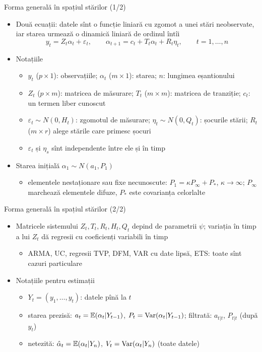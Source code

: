 \begin{frame}{Forma generală în spațiul stărilor (1/2)}
\itemsize{\small}
\begin{itemize}
    \item Două ecuații: datele sînt o funcție liniară cu zgomot a unei stări neobservate, iar starea urmează o dinamică liniară de ordinul întîi \[ y_t = Z_t\alpha_t + \varepsilon_t, \qquad \alpha_{t+1} = c_t + T_t\alpha_t + R_t\eta_t, \qquad t = 1, \dots, n \]
    \item Notațiile
    \begin{itemize}
        \item $y_t$ ($p\times 1$): observațiile; $\alpha_t$ ($m\times 1$): starea; $n$: lungimea eșantionului
        \item $Z_t$ ($p\times m$): matricea de măsurare; $T_t$ ($m\times m$): matricea de tranziție; $c_t$: un termen liber cunoscut
        \item $\varepsilon_t \sim N(0, H_t)$: zgomotul de măsurare; $\eta_t \sim N(0, Q_t)$: șocurile stării; $R_t$ ($m\times r$) alege stările care primesc șocuri
        \item $\varepsilon_t$ și $\eta_s$ sînt independente între ele și în timp
    \end{itemize}
    \item Starea inițială $\alpha_1 \sim N(a_1, P_1)$
    \begin{itemize}
        \item elementele nestaționare sau fixe necunoscute: $P_1 = \kappa P_\infty + P_*$, $\kappa \to \infty$; $P_\infty$ marchează elementele difuze, $P_*$ este covarianța celorlalte
    \end{itemize}
\end{itemize}
\end{frame}

\begin{frame}{Forma generală în spațiul stărilor (2/2)}
\itemsize{\small}
\begin{itemize}
    \item Matricele sistemului $Z_t, T_t, R_t, H_t, Q_t$ depind de parametrii $\psi$; variația în timp a lui $Z_t$ dă regresii cu coeficienți variabili în timp
    \begin{itemize}
        \item ARMA, UC, regresii TVP, DFM, VAR cu date lipsă, ETS: toate sînt cazuri particulare 
    \end{itemize}
    \item Notațiile pentru estimații
    \begin{itemize}
        \item $Y_t = (y_1, \dots, y_t)$: datele pînă la $t$
        \item starea prezisă: $a_t = \mathbb{E}(\alpha_t | Y_{t-1})$, $P_t = \text{Var}(\alpha_t | Y_{t-1})$; filtrată: $a_{t|t}$, $P_{t|t}$ (după $y_t$)
        \item netezită: $\hat\alpha_t = \mathbb{E}(\alpha_t | Y_n)$, $V_t = \text{Var}(\alpha_t | Y_n)$ (toate datele)
    \end{itemize}
\end{itemize}
\end{frame}

